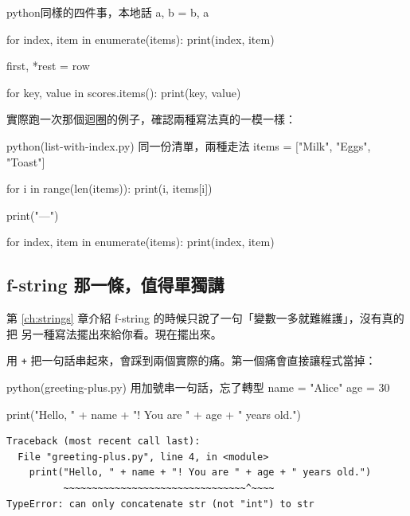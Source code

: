 \begin{code}{python}{同樣的四件事，本地話}
a, b = b, a

for index, item in enumerate(items):
    print(index, item)

first, *rest = row

for key, value in scores.items():
    print(key, value)
\end{code}

實際跑一次那個迴圈的例子，確認兩種寫法真的一模一樣：

\begin{example}{python}{(list-with-index.py) 同一份清單，兩種走法}
items = ["Milk", "Eggs", "Toast"]

for i in range(len(items)):
    print(i, items[i])

print("---")

for index, item in enumerate(items):
    print(index, item)
\end{example}


\subsection*{f-string 那一條，值得單獨講}

第 \ref{ch:strings} 章介紹 f-string 的時候只說了一句「變數一多就難維護」，沒有真的把
另一種寫法擺出來給你看。現在擺出來。

用 \texttt{+} 把一句話串起來，會踩到兩個實際的痛。第一個痛會直接讓程式當掉：

\begin{example}{python}{(greeting-plus.py) 用加號串一句話，忘了轉型}
name = "Alice"
age = 30

print("Hello, " + name + "! You are " + age + " years old.")
\end{example}

\begin{verbatim}
Traceback (most recent call last):
  File "greeting-plus.py", line 4, in <module>
    print("Hello, " + name + "! You are " + age + " years old.")
          ~~~~~~~~~~~~~~~~~~~~~~~~~~~~~~~~^~~~~
TypeError: can only concatenate str (not "int") to str
\end{verbatim}

